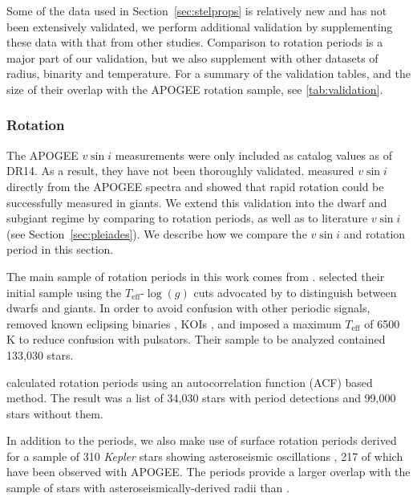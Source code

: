 \documentclass[preprint2]{aastex62}
\newcommand{\vsini}{\ensuremath{v \sin i}}
\newcommand{\Kepler}{\mbox{\textit{Kepler}}}
\newcommand{\Teff}{\ensuremath{T_{\textrm{eff}}}}
\newcommand{\logg}{\ensuremath{\log(g)}}
\begin{document}


Some of the data used in Section~\ref{sec:stelprops} is relatively new and has not been extensively validated, we perform additional validation by supplementing these data with that from other studies. Comparison to rotation periods is a major part of our validation, but we also supplement with other datasets of radius, binarity and temperature. For a summary of the validation tables, and the size of their overlap with the APOGEE rotation sample, see \cref{tab:validation}.

\subsubsection{Rotation}

The APOGEE \vsini{} measurements were only included as 
catalog values as of DR14.  As a result, they have not been thoroughly
validated. \citet{Tayar15} measured \vsini{} directly from the APOGEE spectra 
and showed that rapid rotation could be successfully measured in giants. We
extend this validation into the dwarf and subgiant regime by comparing to 
rotation periods, as well as to literature \vsini{} (see
Section~\ref{sec:pleiades}). We describe how we compare the \vsini{} and
rotation period in this section.

The main sample of rotation periods in this work comes from
\citet{McQuillan14}. \citet{McQuillan14} selected their initial sample using
the \Teff-\logg{} cuts advocated by \citet{Ciardi11} to distinguish between 
dwarfs and giants. In order to avoid 
confusion with other periodic signals, \citet{McQuillan14} removed known 
eclipsing binaries \citep{Prsa11,Slawson11}, KOIs \citep{Akeson13}, and
imposed a maximum \Teff{} of 6500 K to reduce confusion with 
pulsators. Their sample to be analyzed contained 133,030 stars.

\citet{McQuillan14} calculated rotation periods using an autocorrelation
function (ACF) based method. The result 
was a list of 34,030 stars with period detections and 99,000 stars without
them.

In addition to the \citet{McQuillan14} periods, we also make use of surface 
rotation periods derived for a sample of 310 \Kepler{} stars showing
asteroseismic oscillations \citep{Garcia14}, 217 of which have been observed
with APOGEE\@. The \citet{Garcia14} periods provide a larger overlap with the sample
of stars with asteroseismically-derived radii \citep{Serenelli17} than \citet{McQuillan14}.
\end{document}
